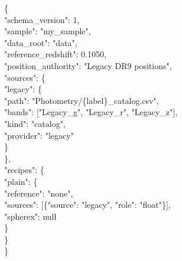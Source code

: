 \documentclass[11pt]{article}
\begin{document}
\begin{cmd}\ttfamily
\{\\
\hspace*{2em}"schema\_version": 1,\\
\hspace*{2em}"sample": "my\_sample",\\
\hspace*{2em}"data\_root": "data",\\
\hspace*{2em}"reference\_redshift": 0.1050,\\
\hspace*{2em}"position\_authority": "Legacy DR9 positions",\\
\hspace*{2em}"sources": \{\\
\hspace*{4em}"legacy": \{\\
\hspace*{6em}"path": "Photometry/\{label\}\_catalog.csv",\\
\hspace*{6em}"bands": ["Legacy\_g", "Legacy\_r", "Legacy\_z"],\\
\hspace*{6em}"kind": "catalog",\\
\hspace*{6em}"provider": "legacy"\\
\hspace*{4em}\}\\
\hspace*{2em}\},\\
\hspace*{2em}"recipes": \{\\
\hspace*{4em}"plain": \{\\
\hspace*{6em}"reference": "none",\\
\hspace*{6em}"sources": [\{"source": "legacy", "role": "float"\}],\\
\hspace*{6em}"spherex": null\\
\hspace*{4em}\}\\
\hspace*{2em}\}\\
\}
\end{cmd}
\end{document}
